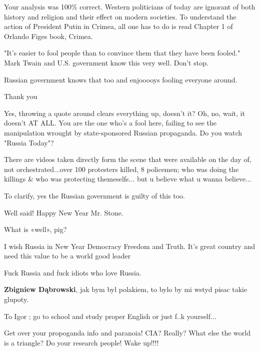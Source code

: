 \begin{itemize}
Your analysis was 100\% correct. Western politicians of today are ignorant of
both history and religion and their effect on modern societies. To understand
the action of President Putin in Crimea, all one has to do is read Chapter 1 of
Orlando Figes book, Crimea.



"It's easier to fool people than to convince them that they have been fooled."
Mark Twain and U.S. government know this very well. Don't stop.

\begin{itemize} %
Russian government knows that too and enjooooys fooling everyone around.

Thank you


Yes, throwing a quote around clears everything up, doesn't it? Oh, no, wait, it
doesn't AT ALL. You are the one who's a fool here, failing to see the
manipulation wrought by state-sponsored Russian propaganda. Do you watch
"Russia Today"?


There are videos taken directly form the scene that were available on the day of, not orchestrated...over 100 protesters killed, 8 policemen; who was doing the killings \& who was protecting themeselfs... but u believe what u wanna believe...

To clarify, yes the Russian government is guilty of this too.
\end{itemize} %

Well said!
Happy New Year Mr. Stone.

\begin{itemize} %
What is «well», pig?

I wish Russia in New Year Democracy Freedom and Truth. It's great country and need this value to be a world good leader

Fuck Russia and fuck idiots who love Russia.

\textbf{Zbigniew Dąbrowski}, jak bym byl polakiem, to bylo by mi wstyd pisac takie glupoty.

To Igor ; go to school and study proper English or just f..k yourself...

Get over your propoganda info and paranoia!
CIA? Really? What else the world is a triangle?
Do your research people! Wake up!!!!


\end{itemize}
\end{itemize}
